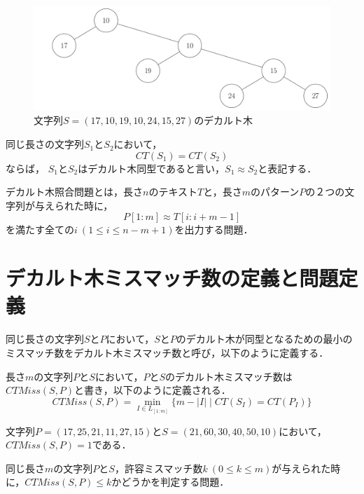\begin{figure}
  \centering
  \includegraphics[width=\linewidth]{figs/out/CartesianTree.pdf}
  \caption{文字列$S=(17,10,19,10,24,15,27)$のデカルト木}
  \label{fig:デカルト木}
\end{figure}

\begin{definition}[デカルト木同型]
  同じ長さの文字列$S_1$と$S_2$において，
  \[CT(S_1)=CT(S_2)\]ならば，
  $S_1$と$S_2$はデカルト木同型であると言い，$S_1 \approx S_2$と表記する．
\end{definition}

\begin{definition}
  デカルト木照合問題とは，長さ$n$のテキスト$T$と，長さ$m$のパターン$P$の２つの文字列が与えられた時に，
  \begin{displaymath}
    P[1:m] \approx T[i:i+m-1]
  \end{displaymath}
  を満たす全ての$i\ (1 \leq i \leq n-m+1)$を出力する問題．
\end{definition}

\section{デカルト木ミスマッチ数の定義と問題定義}
同じ長さの文字列$S$と$P$において，$S$と$P$のデカルト木が同型となるための最小のミスマッチ数をデカルト木ミスマッチ数と呼び，以下のように定義する．
\begin{definition}[デカルト木ミスマッチ数]
  長さ$m$の文字列$P$と$S$において，$P$と$S$のデカルト木ミスマッチ数は$CTMiss(S,P)$と書き，以下のように定義される．
  \begin{displaymath}
    CTMiss(S,P)=\min_{I\in L_{[1:m]}}\{m-|I|\mid CT(S_{I})=CT(P_{I})\}
  \end{displaymath}
\end{definition}

\begin{example}
  文字列$P=(17,25,21,11,27,15)$と$S=(21, 60, 30, 40, 50, 10)$において，$CTMiss(S,P)=1$である．
\end{example}

\begin{problem}[$k$ミスマッチデカルト木決定問題]
  同じ長さ$m$の文字列$P$と$S$，許容ミスマッチ数$k\ (0\leq k \leq m)$が与えられた時に，$CTMiss(S,P)\leq k$かどうかを判定する問題．
\end{problem}
